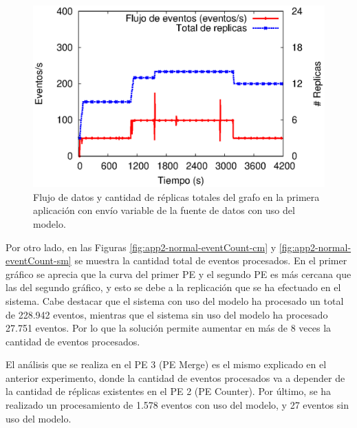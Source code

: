 \begin{figure}[!ht]
	\centering
	\includegraphics[scale=0.7]{images/exp/app2/normal/cm/processSystem.eps}
    \caption{Flujo de datos y cantidad de r\'eplicas totales del grafo en la primera aplicaci\'on con env\'io variable de la fuente de datos con uso del modelo.}
	\label{fig:app2-normal-processSystem-cm}
\end{figure}


Por otro lado, en las Figuras \ref{fig:app2-normal-eventCount-cm} y \ref{fig:app2-normal-eventCount-sm} se muestra la cantidad total de eventos procesados. En el primer gr\'afico se aprecia que la curva del primer PE y el segundo PE es m\'as cercana que las del segundo gr\'afico, y esto se debe a la replicaci\'on que se ha efectuado en el sistema. Cabe destacar que el sistema con uso del modelo ha procesado un total de 228.942 eventos, mientras que el sistema sin uso del modelo ha procesado 27.751 eventos. Por lo que la soluci\'on permite aumentar en m\'as de 8 veces la cantidad de eventos procesados.

El an\'alisis que se realiza en el PE 3 (PE Merge) es el mismo explicado en el anterior experimento, donde la cantidad de eventos procesados va a depender de la cantidad de r\'eplicas existentes en el PE 2 (PE Counter). Por \'ultimo, se ha realizado un procesamiento de 1.578 eventos con uso del modelo, y 27 eventos sin uso del modelo.

